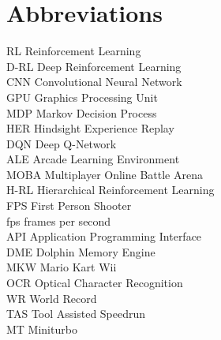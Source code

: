 
\chapter*{Abbreviations}

\begin{flushleft}

RL \hfill Reinforcement Learning
\\D-RL \hfill Deep Reinforcement Learning
\\CNN \hfill  Convolutional Neural Network
\\GPU \hfill  Graphics Processing Unit
\\MDP \hfill  Markov Decision Process
\\HER \hfill  Hindsight Experience Replay
\\DQN \hfill  Deep Q-Network
\\ALE \hfill  Arcade Learning Environment
\\MOBA \hfill  Multiplayer Online Battle Arena
\\H-RL \hfill  Hierarchical Reinforcement Learning
\\FPS \hfill  First Person Shooter
\\fps \hfill  frames per second
\\API \hfill  Application Programming Interface
\\DME \hfill  Dolphin Memory Engine
\\MKW \hfill  Mario Kart Wii
\\OCR \hfill  Optical Character Recognition
\\WR \hfill  World Record
\\TAS \hfill  Tool Assisted Speedrun
\\MT \hfill  Miniturbo

\end{flushleft}